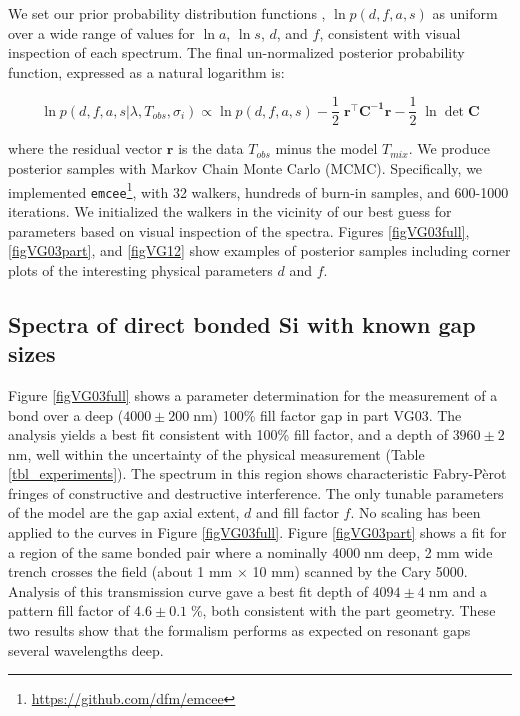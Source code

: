 \documentclass[osajnl,preprint,showpacs,superscriptaddress,12pt]{revtex4-1} %
\begin{document}
We set our prior probability distribution functions \cite{2013sdmm.book.....I}, $\ln{p(d,f,a,s)}$ as uniform over a wide range of values for $\ln{a}$, $\ln{s}$, $d$, and $f$, consistent with visual inspection of each spectrum.  The final un-normalized posterior probability function, expressed as a natural logarithm is:

\begin{equation}
	\ln{p(d,f,a,s|\lambda, T_{obs}, \sigma_i)} \propto \ln{p(d,f,a,s)} -\frac{1}{2}\;\boldsymbol{r^\intercal}\boldsymbol{C^{-1}}\boldsymbol{r} -\frac{1}{2}\;\ln{\det{\boldsymbol{C}}} \label{eqnPosterior}
\end{equation}

where the residual vector $\boldsymbol{r}$ is the data $T_{obs}$ minus the model $T_{mix}$.  We produce posterior samples with Markov Chain Monte Carlo (MCMC).  Specifically, we implemented \texttt{emcee}\footnote{\url{https://github.com/dfm/emcee}}\cite{emcee}, with 32 walkers, hundreds of burn-in samples, and 600-1000 iterations.  We initialized the walkers in the vicinity of our best guess for parameters based on visual inspection of the spectra.  Figures \ref{figVG03full}, \ref{figVG03part}, and \ref{figVG12} show examples of posterior samples including corner plots of the interesting physical parameters $d$ and $f$.

\subsection{Spectra of direct bonded Si with known gap sizes}
\label{secKnownGaps}

Figure \ref{figVG03full} shows a parameter determination for the measurement of a bond over a deep ($4000 \pm 200\;$nm) 100\% fill factor gap in part VG03.  The analysis yields a best fit consistent with 100\% fill factor, and a depth of $3960 \pm 2\;$nm, well within the uncertainty of the physical measurement (Table \ref{tbl_experiments}).  The spectrum in this region shows characteristic Fabry-P\`erot fringes of constructive and destructive interference.  The only tunable parameters of the model are the gap axial extent, $d$ and fill factor $f$.  No scaling has been applied to the curves in Figure \ref{figVG03full}.  Figure \ref{figVG03part} shows a fit for a region of the same bonded pair where a nominally $4000\;$nm deep, 2 mm wide trench crosses the field (about 1 mm $\times$ 10 mm) scanned by the Cary 5000.  Analysis of this transmission curve gave a best fit depth of $4094 \pm 4\;$nm and a pattern fill factor of $4.6 \pm 0.1\;\%$, both consistent with the part geometry.  These two results show that the formalism performs as expected on resonant gaps several wavelengths deep.
\end{document}
